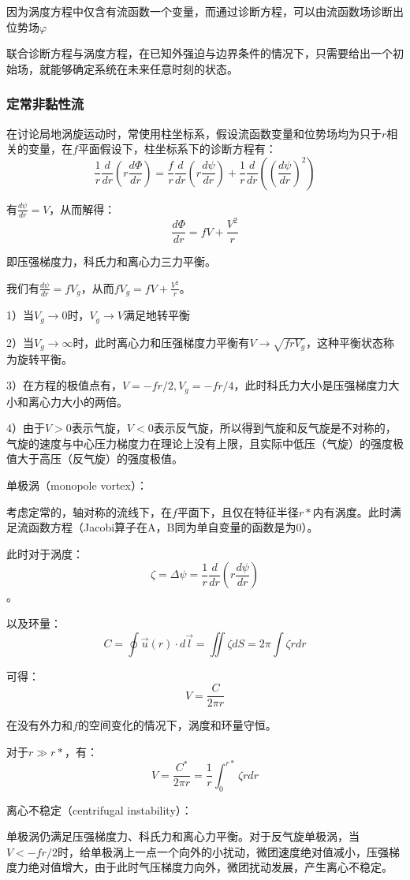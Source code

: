 \documentclass{article}
\begin{document}
因为涡度方程中仅含有流函数一个变量，而通过诊断方程，可以由流函数场诊断出位势场$\varphi$

联合诊断方程与涡度方程，在已知外强迫与边界条件的情况下，只需要给出一个初始场，就能够确定系统在未来任意时刻的状态。


\subsubsection{定常非黏性流}
在讨论局地涡旋运动时，常使用柱坐标系，假设流函数变量和位势场均为只于$r$相关的变量，在$f$平面假设下，柱坐标系下的诊断方程有：
$$\frac{1}{r}\frac{d}{dr}(r\frac{d\Phi}{dr}) = \frac{f}{r}\frac{d}{dr}(r\frac{d\psi}{dr})+\frac{1}{r}\frac{d}{dr}((\frac{d\psi}{dr})^2)$$

有$\frac{d\psi}{dr}=V$，从而解得：
$$\frac{d\Phi}{dr}=fV+\frac{V^2}{r}$$

即压强梯度力，科氏力和离心力三力平衡。

我们有$\frac{d\psi}{dr}=fV_g$，从而$fV_g=fV+\frac{V^2}{r}$。

1）当$V_g\longrightarrow 0$时，$V_g\longrightarrow V$满足地转平衡

2）当$V_g\rightarrow\infty$时，此时离心力和压强梯度力平衡有$V\rightarrow\sqrt{frV_g}$，这种平衡状态称为旋转平衡。

3）在方程的极值点有，$V=-fr/2,V_g=-fr/4$，此时科氏力大小是压强梯度力大小和离心力大小的两倍。

4）由于$V>0$表示气旋，$V<0$表示反气旋，所以得到气旋和反气旋是不对称的，气旋的速度与中心压力梯度力在理论上没有上限，且实际中低压（气旋）的强度极值大于高压（反气旋）的强度极值。

单极涡（monopole vortex）：

考虑定常的，轴对称的流线下，在$f$平面下，且仅在特征半径$r*$内有涡度。此时满足流函数方程（Jacobi算子在A，B同为单自变量的函数是为$0$）。

此时对于涡度：
$$\zeta=\Delta\psi=\frac{1}{r}\frac{d}{dr}\left(r\frac{d\psi}{dr}\right)$$。

以及环量：
$$C=\oint \vec{u}(r)\cdot d\vec{l}=\iint\zeta dS=2\pi\int\zeta rdr$$

可得：
$$V = \frac{C}{2\pi r}$$

在没有外力和$f$的空间变化的情况下，涡度和环量守恒。

对于$r \gg r*$，有：
$$V = \frac{C^*}{2\pi r}=\frac{1}{r}\int_0^{r*}\zeta rdr$$

离心不稳定（centrifugal instability）：

单极涡仍满足压强梯度力、科氏力和离心力平衡。对于反气旋单极涡，当$V<-fr/2$时，给单极涡上一点一个向外的小扰动，微团速度绝对值减小，压强梯度力绝对值增大，由于此时气压梯度力向外，微团扰动发展，产生离心不稳定。
\end{document}
